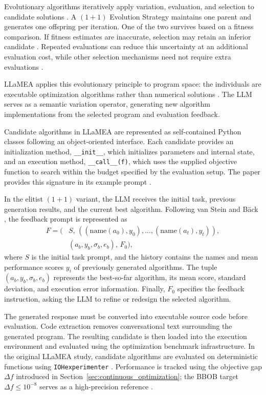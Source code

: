 Evolutionary algorithms iteratively apply variation, evaluation, and
selection to candidate solutions \cite{Eiben2015}. A $(1+1)$ Evolution
Strategy maintains one parent and generates one offspring per iteration.
One of the two survives based on a fitness comparison. If fitness estimates
are inaccurate, selection may retain an inferior candidate
\cite{ArnoldB03,Jin2005}. Repeated evaluations can reduce this
uncertainty at an additional evaluation cost, while other selection
mechanisms need not require extra evaluations \cite{Jin2005}.

LLaMEA applies this evolutionary principle to program space: the individuals
are executable optimization algorithms rather than numerical solutions
\cite{LLaMEA2024}. The LLM serves as a semantic variation operator,
generating new algorithm implementations from the selected program and
evaluation feedback.

Candidate algorithms in LLaMEA are represented as self-contained Python
classes following an object-oriented interface. Each candidate provides an
initialization method, \texttt{\_\_init\_\_}, which initializes parameters
and internal state, and an execution method,
\texttt{\_\_call\_\_(f)}, which uses the supplied objective function
to search within the budget specified by the evaluation setup. The paper
provides this signature in its example prompt \cite{LLaMEA2024}.

In the elitist $(1+1)$ variant, the LLM receives the initial task,
previous generation results, and the current best algorithm. Following
van Stein and B\"ack \cite{LLaMEA2024}, the feedback prompt is represented as
\begin{equation}
\label{eq:llamea_context_assembly}
    \begin{aligned}
        F = \bigl(
        &S,\,
        ((\mathrm{name}(a_0), y_0), \ldots,
        (\mathrm{name}(a_t), y_t)),\\
        &(a_b, y_b, \sigma_b, e_b),\, F_0
        \bigr),
    \end{aligned}
\end{equation}
where $S$ is the initial task prompt, and the history
contains the names and mean performance scores $y_i$
of previously generated algorithms. The tuple
$(a_b, y_b, \sigma_b, e_b)$ represents the best-so-far
algorithm, its mean score, standard deviation, and
execution error information. Finally, $F_0$ specifies
the feedback instruction, asking the LLM to refine
or redesign the selected algorithm.

The generated response must be converted into executable source code before
evaluation. Code extraction removes conversational text surrounding the
generated program. The resulting candidate is then loaded into the execution
environment and evaluated using the optimization benchmark infrastructure.
In the original LLaMEA study, candidate algorithms are evaluated on
deterministic functions using \texttt{IOHexperimenter}
\cite{deNobel2024,LLaMEA2024}. Performance is tracked using the
objective gap $\Delta f$ introduced in
Section~\ref{sec:continuous_optimization}; the BBOB target
$\Delta f \leq 10^{-8}$ serves as a high-precision reference
\cite{Hansen2010,LLaMEA2024}.

